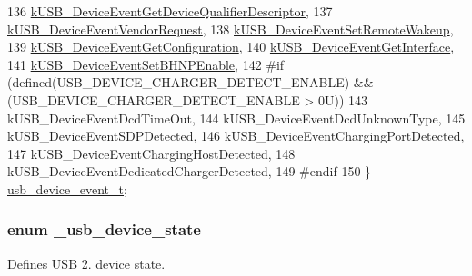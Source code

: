 \begin{DoxyCode}
136     \hyperlink{group__usb__device__driver_ggac66a5e6b9c677f9d8d4f782aa62df540aafad43b8efe4a69fddd2d9989ec941f4}{kUSB\_DeviceEventGetDeviceQualifierDescriptor}, 
137     \hyperlink{group__usb__device__driver_ggac66a5e6b9c677f9d8d4f782aa62df540aaa48528e07e1f9059b0f079dc7e43dda}{kUSB\_DeviceEventVendorRequest},                
138     \hyperlink{group__usb__device__driver_ggac66a5e6b9c677f9d8d4f782aa62df540af95ccd0dea69e67c4ee4b0b1023b1414}{kUSB\_DeviceEventSetRemoteWakeup},              
139     \hyperlink{group__usb__device__driver_ggac66a5e6b9c677f9d8d4f782aa62df540a8f8fd6bd0ea5d9c0aade08ea982d181e}{kUSB\_DeviceEventGetConfiguration},             
140     \hyperlink{group__usb__device__driver_ggac66a5e6b9c677f9d8d4f782aa62df540abfe862150feed0c1bafc94e356c4284a}{kUSB\_DeviceEventGetInterface},                 
141     \hyperlink{group__usb__device__driver_ggac66a5e6b9c677f9d8d4f782aa62df540a778e2f5601392117440d604615fa0a60}{kUSB\_DeviceEventSetBHNPEnable},
142 \textcolor{preprocessor}{#if (defined(USB\_DEVICE\_CHARGER\_DETECT\_ENABLE) && (USB\_DEVICE\_CHARGER\_DETECT\_ENABLE > 0U))
}
143 \textcolor{preprocessor}{}    kUSB\_DeviceEventDcdTimeOut,               
144     kUSB\_DeviceEventDcdUnknownType,           
145     kUSB\_DeviceEventSDPDetected,              
146     kUSB\_DeviceEventChargingPortDetected,     
147     kUSB\_DeviceEventChargingHostDetected,     
148     kUSB\_DeviceEventDedicatedChargerDetected, 
149 \textcolor{preprocessor}{#endif
}
150 \textcolor{preprocessor}{}\} \hyperlink{group__usb__device__driver_ga35623b5263f88037a497e6c6c363b8f1}{usb\_device\_event\_t};
\end{DoxyCode}
\hypertarget{group__usb__device__driver_ga6c3587990ca428244271f14efc909522}{
\subsubsection[{\-\_\-usb\-\_\-device\-\_\-state}]{\setlength{\rightskip}{0pt plus 5cm}enum {\bf \-\_\-usb\-\_\-device\-\_\-state}}}\label{group__usb__device__driver_ga6c3587990ca428244271f14efc909522}


Defines U\-S\-B 2. device state. 

